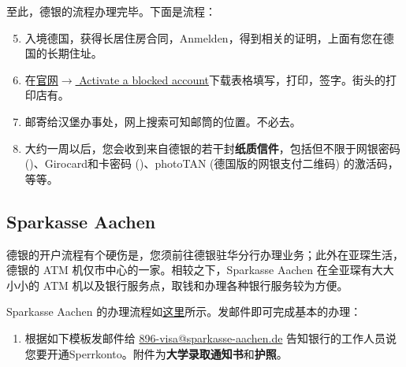     至此，德银的流程办理完毕。下面是流程：

    \begin{enumerate}
      \setcounter{enumi}{4}
      \item 入境德国，获得长居住房合同，Anmelden，得到相关的证明，上面有您在德国的长期住址。
      \item 在\href{https://www.deutsche-bank.de/pk/konto-und-karte/konten-im-ueberblick/internationale-studenten1.html#parsys-tabs_copy_1250445051-tabsParsys-tabpanel_1536556080-tabPanelParsys-accordion-accordionParsys-accordionentry_317017862}{官网$\rightarrow$ Activate a blocked account}下载表格填写，打印，签字。街头的打印店有。
      \item 邮寄给汉堡办事处，网上搜索可知邮筒的位置。不必去。
      \item 大约一周以后，您会收到来自德银的若干封\textbf{纸质信件}，包括但不限于网银密码 ()、Girocard和卡密码 ()、photoTAN (德国版的网银支付二维码) 的激活码，等等。
    \end{enumerate}

  \subsection{Sparkasse Aachen}\label{subsec:Sparkasse Aachen}

    德银的开户流程有个硬伤是，您须前往德银驻华分行办理业务；此外在亚琛生活，德银的 ATM 机仅市中心的一家。相较之下，Sparkasse Aachen 在全亚琛有大大小小的 ATM 机以及银行服务点，取钱和办理各种银行服务较为方便。

    Sparkasse Aachen 的办理流程如\href{https://www.sparkasse.de/pk/ratgeber/bildung/studium/sperrkonto.html}{这里}所示。发邮件即可完成基本的办理：

    \begin{enumerate}
      \item 根据如下模板发邮件给 \href{mailto:896-visa@sparkasse-aachen.de}{896-visa@sparkasse-aachen.de} 告知银行的工作人员说您要开通Sperrkonto。附件为\textbf{大学录取通知书}和\textbf{护照}。
    \end{enumerate}

